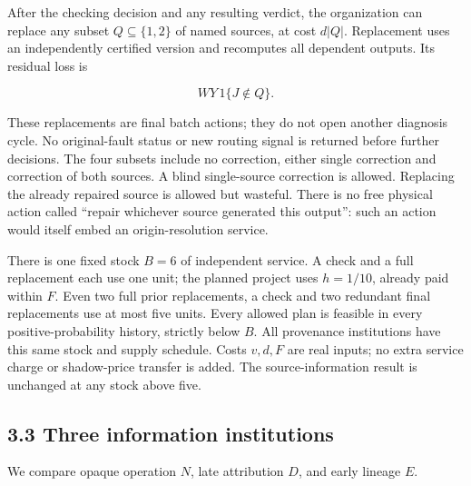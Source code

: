 \documentclass[
  11pt,
  a4paper,
]{article}
\begin{document}
After the checking decision and any resulting verdict, the organization
can replace any subset \(Q\subseteq\{1,2\}\) of named sources, at cost
\(d|Q|\). Replacement uses an independently certified version and
recomputes all dependent outputs. Its residual loss is

\[W Y\,1\{J\notin Q\}.\tag{2}\]

These replacements are final batch actions; they do not open another
diagnosis cycle. No original-fault status or new routing signal is
returned before further decisions. The four subsets include no
correction, either single correction and correction of both sources. A
blind single-source correction is allowed. Replacing the already
repaired source is allowed but wasteful. There is no free physical
action called ``repair whichever source generated this output'': such an
action would itself embed an origin-resolution service.

There is one fixed stock \(B=6\) of independent service. A check and a
full replacement each use one unit; the planned project uses \(h=1/10\),
already paid within \(F\). Even two full prior replacements, a check and
two redundant final replacements use at most five units. Every allowed
plan is feasible in every positive-probability history, strictly below
\(B\). All provenance institutions have this same stock and supply
schedule. Costs \(v,d,F\) are real inputs; no extra service charge or
shadow-price transfer is added. The source-information result is
unchanged at any stock above five.

\subsection{3.3 Three information
institutions}\label{three-information-institutions}

We compare opaque operation \(N\), late attribution \(D\), and early
lineage \(E\).
\end{document}

